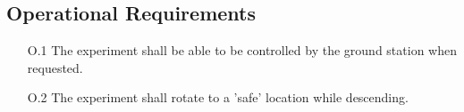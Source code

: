 \subsection{Operational Requirements}

\begin{enumerate}
    \item[O.1] The experiment shall be able to be controlled by the ground station when requested.
    \item[O.2] The experiment shall rotate to a 'safe' location while descending.
\end{enumerate}